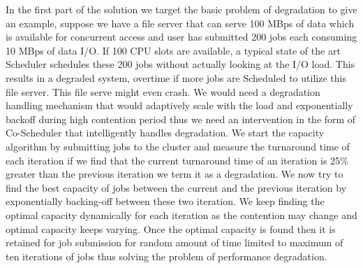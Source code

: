 \documentclass[ms,electronic,double]{nuthesis}
\begin{document}
In the first part of the solution we target the basic problem of degradation to give an example, suppose
we have a file server that can serve 100 MBps of data which is available for concurrent access and user has submitted 200 jobs
each consuming 10 MBps of data I/O. If 100 CPU slots are available, a typical state of the art Scheduler
schedules these 200 jobs without actually looking at the I/O load. This results in a degraded system, 
overtime if more jobs are Scheduled to utilize this file server. This file serve might even crash. We would need a 
degradation handling mechanism that would adaptively scale with the load and  exponentially 
backoff during high contention period thus we need an intervention in the form
of Co-Scheduler that intelligently handles degradation. 
We start the capacity algorithm by submitting jobs to the cluster and measure 
the turnaround time of each iteration if we find that the current turnaround 
time of an iteration is 25\% greater than the previous iteration we term it as a 
degradation. We now try to find the best capacity of jobs between the current 
and the previous iteration by exponentially backing-off between these two iteration. We keep finding the optimal
capacity dynamically for each iteration as the contention may change and optimal capacity keeps 
 varying. Once the optimal capacity is found then it is retained for job submission for random amount of time
 limited to maximum of ten iterations of jobs thus solving the problem of performance degradation. 
 
\end{document}
